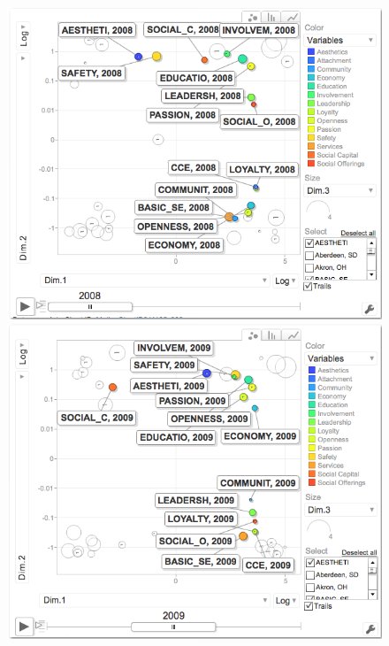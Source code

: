 \documentclass[11pt]{asaproc}
\begin{document}
\begin{figure}[ht]
\begin{framed}
\begin{minipage}[b]{0.45\linewidth}
\centering
\includegraphics[width=\textwidth]{pcaproportions08.png}
\end{minipage}
\hspace{0.5cm}
\begin{minipage}[b]{0.45\linewidth}
\centering
\includegraphics[width=\textwidth]{pcaproportions09.png}

\end{minipage}
\end{framed}
\end{figure}
\end{document}
